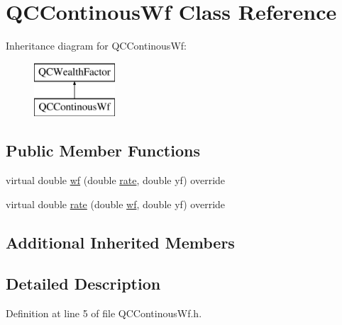 \hypertarget{class_q_c_continous_wf}{\section{Q\+C\+Continous\+Wf Class Reference}
\label{class_q_c_continous_wf}
}
Inheritance diagram for Q\+C\+Continous\+Wf\+:\begin{figure}[H]
\begin{center}
\leavevmode
\includegraphics[height=2.000000cm]{class_q_c_continous_wf}
\end{center}
\end{figure}
\subsection*{Public Member Functions}
\begin{DoxyCompactItemize}
\item 
virtual double \hyperlink{class_q_c_continous_wf_a0384d407c9dc90c1579b0ba53d881d5d}{wf} (double \hyperlink{class_q_c_continous_wf_addd920e12675b08c941c791e09ceca4a}{rate}, double yf) override
\item 
virtual double \hyperlink{class_q_c_continous_wf_addd920e12675b08c941c791e09ceca4a}{rate} (double \hyperlink{class_q_c_continous_wf_a0384d407c9dc90c1579b0ba53d881d5d}{wf}, double yf) override
\end{DoxyCompactItemize}
\subsection*{Additional Inherited Members}


\subsection{Detailed Description}


Definition at line 5 of file Q\+C\+Continous\+Wf.\+h.



